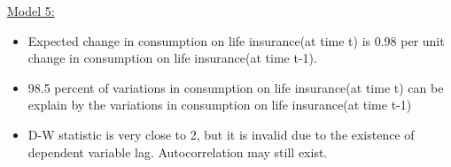 \documentclass{article}
\begin{document}
\underline{Model 5:}

\begin{itemize}
    \item Expected change in consumption on life insurance(at time t) is 0.98 per unit change in consumption on life insurance(at time t-1).
    \item 98.5 percent of variations in consumption on life insurance(at time t) can be explain by the variations in consumption on life insurance(at time t-1)
     \item D-W statistic is very close to 2, but it is invalid due to the existence of dependent variable lag. Autocorrelation may still exist. 
\end{itemize}











    




 
\end{document}

